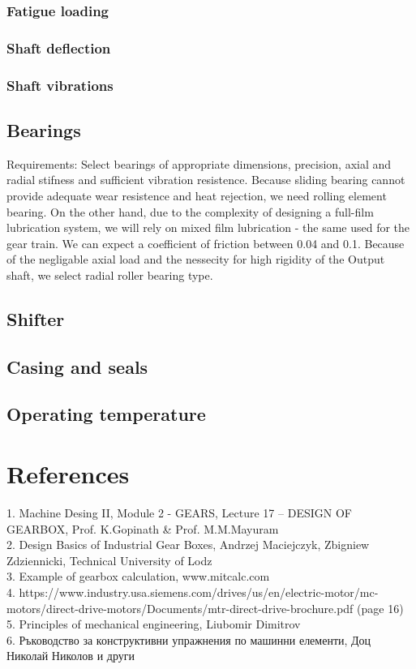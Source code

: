 \documentclass{article}
\begin{document}
\subsubsection{Fatigue loading}
\subsubsection{Shaft deflection}
\subsubsection{Shaft vibrations}
\FPeval{}
\vExample

\subsection{Bearings}
Requirements: Select bearings of appropriate dimensions, precision, axial and radial stifness and sufficient vibration resistence.
Because sliding bearing cannot provide adequate wear resistence and heat rejection, we need rolling element bearing.
On the other hand, due to the complexity of designing a full-film lubrication system, we will rely on mixed film lubrication - the same used for the gear train.
We can expect a coefficient of friction between 0.04 and 0.1.
Because of the negligable axial load and the nessecity for high rigidity of the Output shaft, we select radial roller bearing type.

\subsection{Shifter}
\subsection{Casing and seals}
\subsection{Operating temperature}

\section{References}
1. Machine Desing II, Module 2 - GEARS, Lecture 17 – DESIGN OF GEARBOX, Prof. K.Gopinath \& Prof. M.M.Mayuram \\
2. Design Basics of Industrial Gear Boxes, Andrzej Maciejczyk, Zbigniew Zdziennicki, Technical University of Lodz \\
3. Example of gearbox calculation, www.mitcalc.com \\
4. https://www.industry.usa.siemens.com/drives/us/en/electric-motor/mc-motors/direct-drive-motors/Documents/mtr-direct-drive-brochure.pdf  (page 16) \\
5. Principles of mechanical engineering, Liubomir Dimitrov  \\
6. Ръководство за конструктивни упражнения по машинни елементи, Доц Николай Николов и други

\tableofcontents
\end{document}
